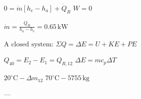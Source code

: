 \( 0 = \dot{m} \left[ h_e - h_a \right] + \dot{Q}_R \)  
\( W = 0 \)  

\( \dot{m} = \frac{\dot{Q}_R}{h_a - h_e} = 0.65 \, \text{kW} \)  

\( \text{A closed system:} \)  
\( \Sigma Q = \Delta E = U + KE + PE \)  

\( Q_{40} = E_2 - E_1 = Q_{R,12} \)  
\( \Delta E = m c_p \Delta T \)  

\( 20^\circ \text{C} - \Delta m_{12} \)  
\( 70^\circ \text{C} - 5755 \, \text{kg} \)

---